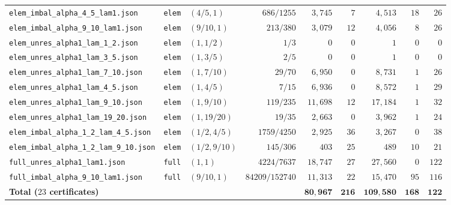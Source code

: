 \documentclass[11pt,a4paper]{amsart}
\theoremstyle{plain}
\theoremstyle{definition}
\theoremstyle{remark}
\begin{document}
\begin{table}[ht]
\begin{tabular}{@{}lllrrrrrr@{}}
\texttt{elem\_imbal\_alpha\_4\_5\_lam1.json}  & \texttt{elem} & $(4/5,1)$     & $686/1255$     & $3{,}745$  & $7$   & $4{,}513$  & $18$  & $26$  \\
\texttt{elem\_imbal\_alpha\_9\_10\_lam1.json} & \texttt{elem} & $(9/10,1)$    & $213/380$      & $3{,}079$  & $12$  & $4{,}056$  & $8$   & $26$  \\
\texttt{elem\_unres\_alpha1\_lam\_1\_2.json}  & \texttt{elem} & $(1,1/2)$     & $1/3$          & $0$        & $0$   & $1$        & $0$   & $0$   \\
\texttt{elem\_unres\_alpha1\_lam\_3\_5.json}  & \texttt{elem} & $(1,3/5)$     & $2/5$          & $0$        & $0$   & $1$        & $0$   & $0$   \\
\texttt{elem\_unres\_alpha1\_lam\_7\_10.json} & \texttt{elem} & $(1,7/10)$    & $29/70$        & $6{,}950$  & $0$   & $8{,}731$  & $1$   & $26$  \\
\texttt{elem\_unres\_alpha1\_lam\_4\_5.json}  & \texttt{elem} & $(1,4/5)$     & $7/15$         & $6{,}936$  & $0$   & $8{,}572$  & $1$   & $29$  \\
\texttt{elem\_unres\_alpha1\_lam\_9\_10.json} & \texttt{elem} & $(1,9/10)$    & $119/235$      & $11{,}698$ & $12$  & $17{,}184$ & $1$   & $32$  \\
\texttt{elem\_unres\_alpha1\_lam\_19\_20.json}& \texttt{elem} & $(1,19/20)$   & $19/35$        & $2{,}663$  & $0$   & $3{,}962$  & $1$   & $24$  \\
\texttt{elem\_imbal\_alpha\_1\_2\_lam\_4\_5.json}& \texttt{elem}& $(1/2,4/5)$ & $1759/4250$    & $2{,}925$  & $36$  & $3{,}267$  & $0$   & $38$  \\
\texttt{elem\_imbal\_alpha\_1\_2\_lam\_9\_10.json}& \texttt{elem}& $(1/2,9/10)$& $145/306$   & $403$      & $25$  & $489$      & $10$  & $21$  \\
\midrule
\texttt{full\_unres\_alpha1\_lam1.json}       & \texttt{full} & $(1,1)$       & $4224/7637$    & $18{,}747$ & $27$  & $27{,}560$ & $0$   & $122$ \\
\texttt{full\_imbal\_alpha\_9\_10\_lam1.json} & \texttt{full} & $(9/10,1)$    & $84209/152740$ & $11{,}313$ & $22$  & $15{,}470$ & $95$  & $116$ \\
\midrule
\textbf{Total ($23$ certificates)}            &               &               &                & $\mathbf{80{,}967}$ & $\mathbf{216}$ & $\mathbf{109{,}580}$ & $\mathbf{168}$ & $\mathbf{122}$ \\
\bottomrule
\end{tabular}
\end{table}
\end{document}
